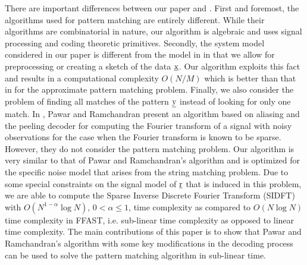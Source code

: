 There are important differences between our paper and \cite{hassanieh2012faster,andoni2013shift,boyer1977fast,amir2004faster}. First and foremost, the algorithms used for pattern matching are entirely different. While their algorithms are combinatorial in nature, our algorithm is algebraic and uses signal processing and coding theoretic primitives. Secondly, the system model considered in our paper is different from the model in \cite{hassanieh2012faster,andoni2013shift,boyer1977fast,amir2004faster} in that we allow for preprocessing or creating a sketch of the data $\underline{\mathrm{x}}$. Our algorithm exploits this fact and results in a computational complexity $O(N/M)$ which is better than that in \cite{andoni2013shift} for the approximate pattern matching problem.  Finally, we also consider the problem of finding all matches of the pattern $\underline{\mathrm{y}}$ instead of looking for only one match. In \cite{pawar2014robust}, Pawar and Ramchandran present an algorithm based on aliasing and the peeling decoder for computing the Fourier transform of a signal with noisy observations for the case when the Fourier transform is known to be sparse. However, they do not consider the pattern matching problem. Our algorithm is very similar to that of Pawar and Ramchandran's algorithm and is optimized for the specific noise model that arises from the string matching problem. Due to some special constraints on the signal model of $\underline{\mathrm{r}}$ that is induced in this problem, we are able to compute the Sparse Inverse Discrete Fourier Transform (SIDFT) with $O(N^{1-\alpha} \log N)$, $0 < \alpha \leq 1$, time complexity as compared to $O(N \log N)$ time complexity in FFAST, i.e. sub-linear time complexity as opposed to linear time complexity. The main contributions of this paper is to show that Pawar and Ramchandran's algorithm with some key modifications in the decoding process can be used to solve the pattern matching algorithm in sub-linear time.